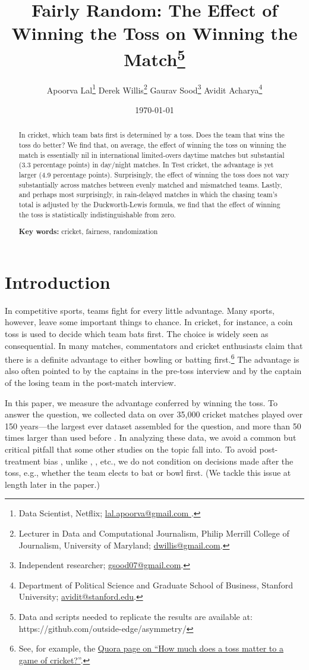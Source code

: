 \documentclass[12pt, letterpaper]{article}
\title{Fairly Random: The Effect of Winning the Toss on Winning the Match\thanks{Data and scripts needed to replicate the results are available at: https://github.com/outside-edge/asymmetry/}}
\author{
Apoorva Lal\thanks{Data Scientist, Netflix;  \href{mailto:lal.apoorva@gmail.com}{lal.apoorva@gmail.com }.} \;\;
Derek Willis\thanks{Lecturer in Data and Computational Journalism, Philip Merrill College of Journalism, University of Maryland;  \href{mailto:dwillis@gmail.com}{dwillis@gmail.com}.}  \;\;
Gaurav Sood\thanks{Independent researcher;  \href{mailto:gsood07@gmail.com}{gsood07@gmail.com}.}\;\;
Avidit Acharya\thanks{Department of Political Science and Graduate School of Business, Stanford University; \href{mailto:avidit@stanford.edu}{avidit@stanford.edu}.}
}
\date{\today}
\begin{document}
\maketitle
\doublespacing

\begin{abstract}

In cricket, which team bats first is determined by a toss. Does the team that wins the toss do better? We find that, on average, the effect of winning the toss on winning the match is essentially nil in international limited-overs daytime matches but substantial (3.3 percentage points) in day/night matches. In Test cricket, the advantage is yet larger (4.9 percentage points). Surprisingly, the effect of winning the toss does not vary substantially across matches between evenly matched and mismatched teams. Lastly, and perhaps most surprisingly, in rain-delayed matches in which the chasing team's total is adjusted by the Duckworth-Lewis formula, we find that the effect of winning the toss is statistically indistinguishable from zero.

\smallskip

\textbf{Key words:} cricket, fairness, randomization

\end{abstract}

\section{Introduction}

In competitive sports, teams fight for every little advantage. Many sports, however, leave some important things to chance. In cricket, for instance, a coin toss is used to decide which team bats first. The choice is widely seen as consequential. In many matches, commentators and cricket enthusiasts claim that there is a definite advantage to either bowling or batting first.\footnote{See, for example, the \href{https://www.quora.com/How-much-does-a-toss-matter-to-a-game-of-cricket}{Quora page on ``How much does a toss matter to a game of cricket?''}.} The advantage is also often pointed to by the captains in the pre-toss interview and by the captain of the losing team in the post-match interview.

In this paper, we measure the advantage conferred by winning the toss. To answer the question, we collected data on over 35,000 cricket matches played over 150 years---the largest ever dataset assembled for the question, and more than 50 times larger than used before \citep[see,][]{dawson2009bat, de1998winning}. In analyzing these data, we avoid a common but critical pitfall that some other studies on the topic fall into. To avoid post-treatment bias \citep[see][]{acharya2015}, unlike \citet{dawson2009bat}, \citet{Saad2015}, etc., we do not condition on decisions made after the toss, e.g., whether the team elects to bat or bowl first. (We tackle this issue at length later in the paper.)
\end{document}
